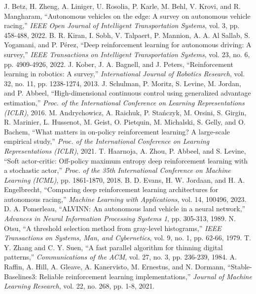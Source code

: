 \documentclass{IJCAS}
\begin{document}
\begin{reference}
 J. Betz, H. Zheng, A. Liniger, U. Rosolia, P. Karle, M. Behl, V. Krovi, and R. Mangharam, ``Autonomous vehicles on the edge: A survey on autonomous vehicle racing,'' \textit{IEEE Open Journal of Intelligent Transportation Systems}, vol. 3, pp. 458-488, 2022.
 B. R. Kiran, I. Sobh, V. Talpaert, P. Mannion, A. A. Al Sallab, S. Yogamani, and P. P\'erez, ``Deep reinforcement learning for autonomous driving: A survey,'' \textit{IEEE Transactions on Intelligent Transportation Systems}, vol. 23, no. 6, pp. 4909-4926, 2022.
 J. Kober, J. A. Bagnell, and J. Peters, ``Reinforcement learning in robotics: A survey,'' \textit{International Journal of Robotics Research}, vol. 32, no. 11, pp. 1238-1274, 2013.
 J. Schulman, P. Moritz, S. Levine, M. Jordan, and P. Abbeel, ``High-dimensional continuous control using generalized advantage estimation,'' \textit{Proc. of the International Conference on Learning Representations (ICLR)}, 2016.
 M. Andrychowicz, A. Raichuk, P. Sta\'nczyk, M. Orsini, S. Girgin, R. Marinier, L. Hussenot, M. Geist, O. Pietquin, M. Michalski, S. Gelly, and O. Bachem, ``What matters in on-policy reinforcement learning? A large-scale empirical study,'' \textit{Proc. of the International Conference on Learning Representations (ICLR)}, 2021.
 T. Haarnoja, A. Zhou, P. Abbeel, and S. Levine, ``Soft actor-critic: Off-policy maximum entropy deep reinforcement learning with a stochastic actor,'' \textit{Proc. of the 35th International Conference on Machine Learning (ICML)}, pp. 1861-1870, 2018.
 B. D. Evans, H. W. Jordaan, and H. A. Engelbrecht, ``Comparing deep reinforcement learning architectures for autonomous racing,'' \textit{Machine Learning with Applications}, vol. 14, 100496, 2023.
 D. A. Pomerleau, ``ALVINN: An autonomous land vehicle in a neural network,'' \textit{Advances in Neural Information Processing Systems 1}, pp. 305-313, 1989.
 N. Otsu, ``A threshold selection method from gray-level histograms,'' \textit{IEEE Transactions on Systems, Man, and Cybernetics}, vol. 9, no. 1, pp. 62-66, 1979.
 T. Y. Zhang and C. Y. Suen, ``A fast parallel algorithm for thinning digital patterns,'' \textit{Communications of the ACM}, vol. 27, no. 3, pp. 236-239, 1984.
 A. Raffin, A. Hill, A. Gleave, A. Kanervisto, M. Ernestus, and N. Dormann, ``Stable-Baselines3: Reliable reinforcement learning implementations,'' \textit{Journal of Machine Learning Research}, vol. 22, no. 268, pp. 1-8, 2021.
\end{reference}
\end{document}
